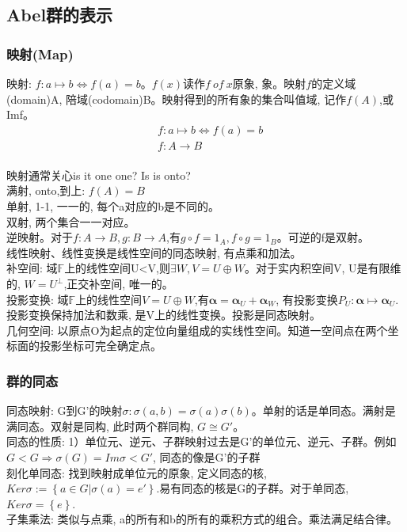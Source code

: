 \documentclass[UTF8]{../09-Mathematics}
\begin{document}
\subsection{Abel群的表示}
\subsubsection{映射(Map)}
映射: $f:a \mapsto b \Leftrightarrow f(a)=b$。$f(x)读作f \ of \ x$原象, 象。映射$f$的定义域(domain)A, 陪域(codomain)B。映射得到的所有象的集合叫值域, 记作$f(A)$,或Imf。
\begin{equation}
  \begin{split}
  &f:a \mapsto b \Leftrightarrow f(a)=b\\
  &f: A \to B\\
  \end{split}
\end{equation}

映射通常关心is it one one? Is is onto? \\
满射, onto,到上: $f(A)=B$\\
单射, 1-1, 一一的, 每个a对应的b是不同的。\\
双射, 两个集合一一对应。\\
逆映射。对于$f:A \to B, g: B \to A$,有$g \circ f =1_A, f \circ g =1_B$。可逆的f是双射。\\

线性映射、线性变换是线性空间的同态映射, 有点乘和加法。\\
补空间: 域$\mathbb F$上的线性空间U<V,则$\exists W, V=U \oplus W$。对于实内积空间V, U是有限维的, $W=U^{\perp}$,正交补空间, 唯一的。\\
投影变换: 域$\mathbb F$上的线性空间$V=U \oplus W$,有$\mathbf \alpha =\mathbf \alpha _U+\mathbf \alpha _W$, 有投影变换$P_U:\mathbf \alpha \mapsto \mathbf \alpha _U$.投影变换保持加法和数乘, 是V上的线性变换。投影是同态映射。\\
几何空间: 以原点O为起点的定位向量组成的实线性空间。知道一空间点在两个坐标面的投影坐标可完全确定点。

\subsubsection{群的同态}
同态映射: G到G'的映射$\sigma: \sigma(a,b)=\sigma(a) \sigma(b)$。单射的话是单同态。满射是满同态。双射是同构, 此时两个群同构, $G \cong G'$。\\
同态的性质: 1）单位元、逆元、子群映射过去是G’的单位元、逆元、子群。例如$G<G \Rightarrow \sigma(G)=Im\sigma <G'$, 同态的像是G'的子群\\
刻化单同态: 找到映射成单位元的原象, 定义同态的核, $Ker\sigma:=\left\{ a \in G | \sigma(a)=e' \right\}$.易有同态的核是G的子群。对于单同态, $Ker\sigma=\left\{ e \right\}$.\\
子集乘法: 类似与点乘, a的所有和b的所有的乘积方式的组合。乘法满足结合律。\\
\end{document}

